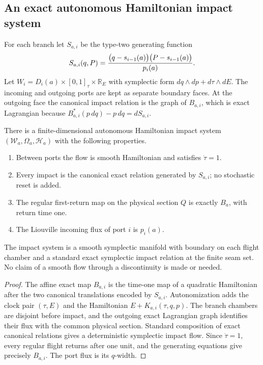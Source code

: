 \subsection{An exact autonomous Hamiltonian impact system}

For each branch let $S_{a,i}$ be the type-two generating function
\[
 S_{a,i}(q,P)=
 {\bigl(q-s_{i-1}(a)\bigr)
  \bigl(P-s_{i-1}(a)\bigr)\over p_i(a)}.
\]
Let $W_i=D_i(a)\times[0,1]_\tau\times\mathbb R_E$ with symplectic form
$dq\wedge dp+d\tau\wedge dE$.  The incoming and outgoing ports are kept as
separate boundary faces.  At the outgoing face the canonical impact relation
is the graph of $B_{a,i}$, which is exact Lagrangian because
$B_{a,i}^*(p\,dq)-p\,dq=dS_{a,i}$.

\begin{theorem}
\label{thm:r13-a1-impact}
There is a finite-dimensional autonomous Hamiltonian impact system
$(\mathcal W_a,\Omega_a,\mathscr H_a)$ with the following properties.
\begin{enumerate}[label=(\roman*)]
\item Between ports the flow is smooth Hamiltonian and satisfies
      $\dot\tau=1$.
\item Every impact is the canonical exact relation generated by $S_{a,i}$;
      no stochastic reset is added.
\item The regular first-return map on the physical section $Q$ is exactly
      $B_a$, with return time one.
\item The Liouville incoming flux of port $i$ is $p_i(a)$.
\end{enumerate}
The impact system is a smooth symplectic manifold with boundary on each
flight chamber and a standard exact symplectic impact relation at the finite
seam set.  No claim of a smooth flow through a discontinuity is made or
needed.
\end{theorem}

\begin{proof}
The affine exact map $B_{a,i}$ is the time-one map of a quadratic
Hamiltonian after the two canonical translations encoded by $S_{a,i}$.
Autonomization adds the clock pair $(\tau,E)$ and the Hamiltonian
$E+K_{a,i}(\tau,q,p)$.  The branch chambers are disjoint before impact, and
the outgoing exact Lagrangian graph identifies their flux with the common
physical section.  Standard composition of exact canonical relations gives
a deterministic symplectic impact flow.  Since $\dot\tau=1$, every regular
flight returns after one unit, and the generating equations give precisely
$B_{a,i}$.  The port flux is its $q$-width.
\end{proof}

